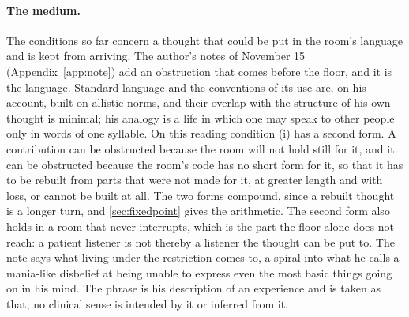\paragraph{The medium.} The conditions so far concern a thought that could be put in the room's language and is kept from arriving. The author's notes of November 15 (Appendix~\ref{app:note}) add an obstruction that comes before the floor, and it is the language. Standard language and the conventions of its use are, on his account, built on allistic norms, and their overlap with the structure of his own thought is minimal; his analogy is a life in which one may speak to other people only in words of one syllable. On this reading condition (i) has a second form. A contribution can be obstructed because the room will not hold still for it, and it can be obstructed because the room's code has no short form for it, so that it has to be rebuilt from parts that were not made for it, at greater length and with loss, or cannot be built at all. The two forms compound, since a rebuilt thought is a longer turn, and \autoref{sec:fixedpoint} gives the arithmetic. The second form also holds in a room that never interrupts, which is the part the floor alone does not reach: a patient listener is not thereby a listener the thought can be put to. The note says what living under the restriction comes to, a spiral into what he calls a mania-like disbelief at being unable to express even the most basic things going on in his mind. The phrase is his description of an experience and is taken as that; no clinical sense is intended by it or inferred from it.

